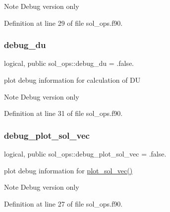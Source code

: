 \begin{DoxyNote}{Note}
Debug version only 
\end{DoxyNote}


Definition at line 29 of file sol\+\_\+ops.\+f90.

\mbox{\label{namespacesol__ops_acb6465b87495933920896a52b4298a4c}} 
\subsubsection{\texorpdfstring{debug\+\_\+du}{debug\_du}}
{\footnotesize\ttfamily logical, public sol\+\_\+ops\+::debug\+\_\+du = .false.}



plot debug information for calculation of {\ttfamily DU} 

\begin{DoxyNote}{Note}
Debug version only 
\end{DoxyNote}


Definition at line 31 of file sol\+\_\+ops.\+f90.

\mbox{\label{namespacesol__ops_ae0df0d66ef4ea0155cfbeb23973c28ac}} 
\subsubsection{\texorpdfstring{debug\+\_\+plot\+\_\+sol\+\_\+vec}{debug\_plot\_sol\_vec}}
{\footnotesize\ttfamily logical, public sol\+\_\+ops\+::debug\+\_\+plot\+\_\+sol\+\_\+vec = .false.}



plot debug information for \hyperlink{namespacesol__ops_a13b3cf2fb6437a3c93256368fa91c267}{plot\+\_\+sol\+\_\+vec()} 

\begin{DoxyNote}{Note}
Debug version only 
\end{DoxyNote}


Definition at line 27 of file sol\+\_\+ops.\+f90.

\mbox{\label{namespacesol__ops_a718171b8636e5e4ad98fd4e35ca5b71f}} 
